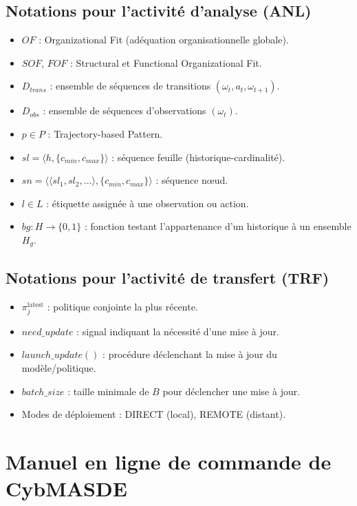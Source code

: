 \section{Notations pour l'activité d'analyse (ANL)}

\begin{itemize}
  \item $OF$ : Organizational Fit (adéquation organisationnelle globale).
  \item $SOF$, $FOF$ : Structural et Functional Organizational Fit.
  \item $D_{trans}$ : ensemble de séquences de transitions $(\omega_t, a_t, \omega_{t+1})$.
  \item $D_{obs}$ : ensemble de séquences d'observations $(\omega_t)$.
  \item $p \in P$ : Trajectory-based Pattern.
  \item $sl = \langle h, \{c_{min},c_{max}\}\rangle$ : séquence feuille (historique-cardinalité).
  \item $sn = \langle \langle sl_1, sl_2, ...\rangle, \{c_{min},c_{max}\}\rangle$ : séquence nœud.
  \item $l \in L$ : étiquette assignée à une observation ou action.
  \item $bg : H \to \{0,1\}$ : fonction testant l'appartenance d'un historique à un ensemble $H_g$.
\end{itemize}

\section{Notations pour l'activité de transfert (TRF)}

\begin{itemize}
  \item $\pi^{\text{latest}}_j$ : politique conjointe la plus récente.
  \item $need\_update$ : signal indiquant la nécessité d'une mise à jour.
  \item $launch\_update()$ : procédure déclenchant la mise à jour du modèle/politique.
  \item $batch\_size$ : taille minimale de $B$ pour déclencher une mise à jour.
  \item Modes de déploiement : DIRECT (local), REMOTE (distant).
\end{itemize}

\clearpage
\thispagestyle{empty}
\null
\newpage

\chapter{Manuel en ligne de commande de CybMASDE}\label{appendix:cybmasde-manual}

